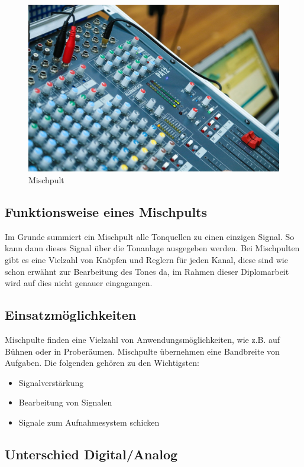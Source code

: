 \begin{figure}[H]
	\centering
	\includegraphics[width=0.8\linewidth]{images/mischpult.jpg}
	\caption[Mischpult]{Mischpult}
	\label{fig:Mischpult}
\end{figure}

\subsection{Funktionsweise eines Mischpults}
Im Grunde summiert ein Mischpult alle Tonquellen zu einen einzigen Signal. So kann dann dieses Signal über die Tonanlage ausgegeben werden. Bei Mischpulten gibt es eine Vielzahl von Knöpfen und Reglern für jeden Kanal, diese sind wie schon erwähnt zur Bearbeitung des Tones da, im Rahmen dieser Diplomarbeit wird auf dies nicht genauer eingagangen. \\
\cite{Mischpult_Erklaerung}

\subsection{Einsatzmöglichkeiten}
Mischpulte finden eine Vielzahl von Anwendungsmöglichkeiten, wie z.B. auf Bühnen oder in Proberäumen. Mischpulte übernehmen eine Bandbreite von Aufgaben. Die folgenden gehören zu den Wichtigsten:
\begin{itemize}
	\item Signalverstärkung
	\item Bearbeitung von Signalen
	\item Signale zum Aufnahmesystem schicken
\end{itemize}
\cite{Mischpult_Verwendungszweck}

\subsection{Unterschied Digital/Analog}
